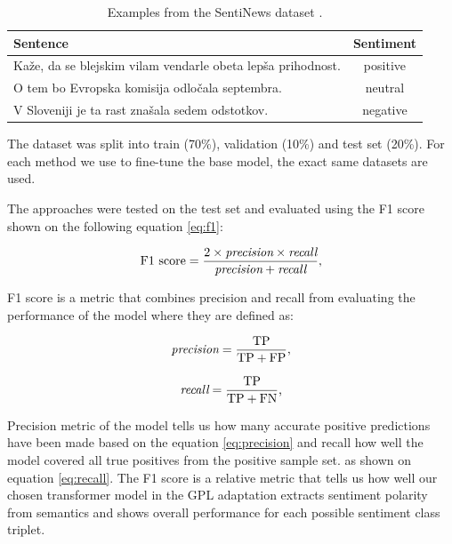 \documentclass[fleqn,moreauthors,10pt]{ds_report}
\begin{document}
\begin{table}[!h]
	\footnotesize
	\begin{center}
		\begin{tabular}{ |l|c| }
		\hline
		\rowcolor{Red}Sentence & Sentiment \\
		\hline

		Kaže, da se blejskim vilam vendarle obeta lepša prihodnost. & positive\\
		O tem bo Evropska komisija odločala septembra. & neutral\\
		V Sloveniji je ta rast znašala sedem odstotkov. & negative\\

		\hline
		\end{tabular}
	\end{center}
\caption{Examples from the SentiNews dataset \cite{sentiNews}.}
\label{tab1}
\end{table}

The dataset was split into train (70\%), validation (10\%) and test set (20\%). For each method we use to fine-tune the base model, the exact same datasets are used.

The approaches were tested on the test set and evaluated using the F1 score shown on the following equation \ref{eq:f1}:

\begin{equation}
	\text{F1 score} =\frac{2 \times \text{\it{precision}} \times \text{\it{recall}}}{\text{\it{precision}} + \text{\it{recall}}} \text{,}
\label{eq:f1}
\end{equation}

F1 score is a metric that combines precision and recall from evaluating the performance of the model where they are defined as:

\begin{equation}
	\text{\it{precision}} =\frac {\text{TP}}{\text{TP} + \text{FP}} \text{,}
\label{eq:precision}
\end{equation}

\begin{equation}
	\text{\it{recall}} =\frac {\text{TP}}{\text{TP} + \text{FN}} \text{,}
\label{eq:recall}
\end{equation}

Precision metric of the model tells us how many accurate positive predictions have been made based on the equation \ref{eq:precision} and recall how well the model covered all true positives from the positive sample set. as shown on equation \ref{eq:recall}. The F1 score is a relative metric that tells us how well our chosen transformer model in the GPL adaptation extracts sentiment polarity from semantics and shows overall performance for each possible sentiment class triplet.
\end{document}
